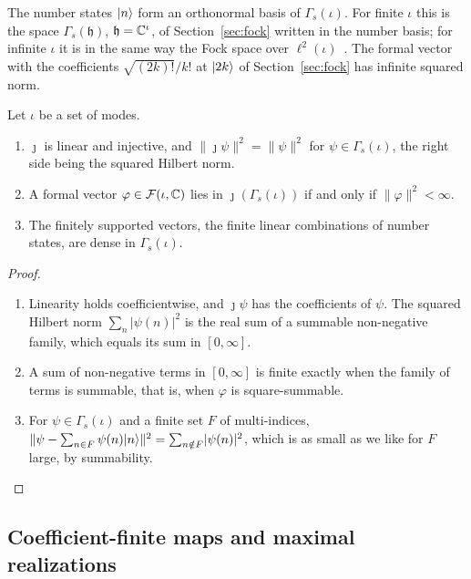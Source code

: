 \begin{vetbenv}
The number states $\lvert n\rangle$ form an orthonormal basis of $\Gamma_s(\iota)$. For finite $\iota$ this is
the space $\Gamma_s(\mathfrak h)$, $\mathfrak h=\mathbb C^\iota$, of Section~\ref{sec:fock} written in the
number basis; for infinite $\iota$ it is in the same way the Fock space over $\ell^2(\iota)$~\cite{dg}.
The formal vector with the coefficients $\sqrt{(2k)!}/k!$ at $\lvert 2k\rangle$ of Section~\ref{sec:fock} has
infinite squared norm.

\begin{lemma}\label{lem:fock-hilbert}
Let $\iota$ be a set of modes.
\begin{enumerate}
\item[(a)] $\jmath$ is linear and injective, and $\lVert\jmath\psi\rVert^2=\lVert\psi\rVert^2$ for
$\psi\in\Gamma_s(\iota)$, the right side being the squared Hilbert norm.
\item[(b)] A formal vector $\varphi\in\mathcal F(\iota,\mathbb C)$ lies in $\jmath(\Gamma_s(\iota))$ if and only if
$\lVert\varphi\rVert^2<\infty$.
\item[(c)] The finitely supported vectors, the finite linear combinations of number states, are dense
in $\Gamma_s(\iota)$.
\end{enumerate}
\end{lemma}

\begin{proof}
\begin{enumerate}
\item[(a)] Linearity holds coefficientwise, and $\jmath\psi$ has the coefficients of $\psi$. The squared
Hilbert norm $\sum_n\lvert\psi(n)\rvert^2$ is the real sum of a summable non-negative family, which
equals its sum in $[0,\infty]$.
\item[(b)] A sum of non-negative terms in $[0,\infty]$ is finite exactly when the family of terms is
summable, that is, when $\varphi$ is square-summable.
\item[(c)] For $\psi\in\Gamma_s(\iota)$ and a finite set $F$ of multi-indices,
$\lVert\psi-\sum_{n\in F}\psi(n)\lvert n\rangle\rVert^2=\sum_{n\notin F}\lvert\psi(n)\rvert^2$, which is as small
as we like for $F$ large, by summability.\qedhere
\end{enumerate}
\end{proof}

\subsection{Coefficient-finite maps and maximal realizations}\label{sec:fock-coefffinite}


\end{vetbenv}

